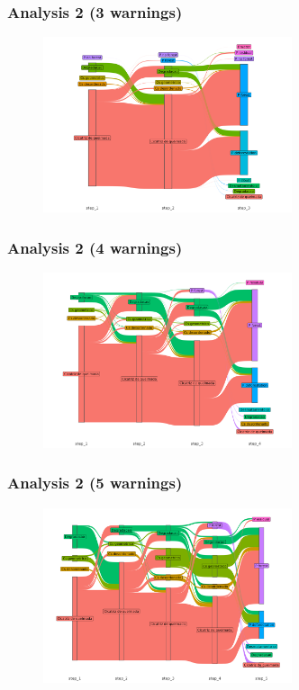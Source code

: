 \documentclass[aspectratio=169]{beamer}
\begin{document}
\begin{frame}
    \frametitle{Analysis 2 (3 warnings) }
    \begin{figure}[h] 
    \includegraphics[width=0.65\textwidth]{./figures/an2_plot_deter_prodes_subarea_trajectory_3.png}
    \end{figure}
\end{frame}

\begin{frame}
    \frametitle{Analysis 2 (4 warnings) }
    \begin{figure}[h] 
    \includegraphics[width=0.65\textwidth]{./figures/an2_plot_deter_prodes_subarea_trajectory_4.png}
    \end{figure}
\end{frame}

\begin{frame}
    \frametitle{Analysis 2 (5 warnings) }
    \begin{figure}[h] 
    \includegraphics[width=0.65\textwidth]{./figures/an2_plot_deter_prodes_subarea_trajectory_5.png}
    \end{figure}
\end{frame}
\end{document}
